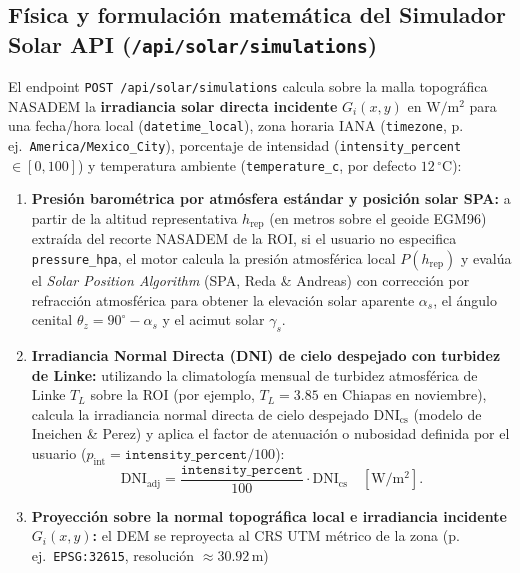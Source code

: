 \documentclass[11pt,a4paper]{article}
\newcommand{\unit}[1]{\mathrm{#1}}
\begin{document}
\subsection{Física y formulación matemática del Simulador Solar API (\texttt{/api/solar/simulations})}

El endpoint \texttt{POST /api/solar/simulations} calcula sobre la malla topográfica NASADEM la
\textbf{irradiancia solar directa incidente} $G_i(x,y)$ en $\unit{W/m^2}$ para una fecha/hora local
(\texttt{datetime\_local}), zona horaria IANA (\texttt{timezone}, p.\,ej.\ \texttt{America/Mexico\_City}),
porcentaje de intensidad (\texttt{intensity\_percent} $\in [0, 100]$) y temperatura ambiente
(\texttt{temperature\_c}, por defecto $12\,^\circ\unit{C}$):

\begin{enumerate}
  \item \textbf{Presión barométrica por atmósfera estándar y posición solar SPA:} a partir de la altitud
        representativa $h_{\mathrm{rep}}$ (en metros sobre el geoide EGM96) extraída del recorte NASADEM de la
        ROI, si el usuario no especifica \texttt{pressure\_hpa}, el motor calcula la presión atmosférica local
        $P(h_{\mathrm{rep}})$ y evalúa el \emph{Solar Position Algorithm} (SPA, Reda \& Andreas) con corrección
        por refracción atmosférica para obtener la elevación solar aparente $\alpha_s$, el ángulo cenital
        $\theta_z = 90^\circ - \alpha_s$ y el acimut solar $\gamma_s$.
  \item \textbf{Irradiancia Normal Directa (DNI) de cielo despejado con turbidez de Linke:} utilizando la
        climatología mensual de turbidez atmosférica de Linke $T_L$ sobre la ROI (por ejemplo, $T_L = 3.85$ en
        Chiapas en noviembre), calcula la irradiancia normal directa de cielo despejado $\mathrm{DNI}_{\mathrm{cs}}$
        (modelo de Ineichen \& Perez) y aplica el factor de atenuación o nubosidad definida por el usuario
        ($p_{\mathrm{int}} = \texttt{intensity\_percent}/100$):
        \begin{equation}
          \mathrm{DNI}_{\mathrm{adj}} = \frac{\texttt{intensity\_percent}}{100} \cdot \mathrm{DNI}_{\mathrm{cs}}
          \quad [\unit{W/m^2}].
          \label{eq:solar-dni-adj}
        \end{equation}
  \item \textbf{Proyección sobre la normal topográfica local e irradiancia incidente $G_i(x,y)$:} el DEM se
        reproyecta al CRS UTM métrico de la zona (p.\,ej.\ \texttt{EPSG:32615}, resolución $\approx 30.92\,\unit{m}$)

\end{enumerate}
\end{document}
